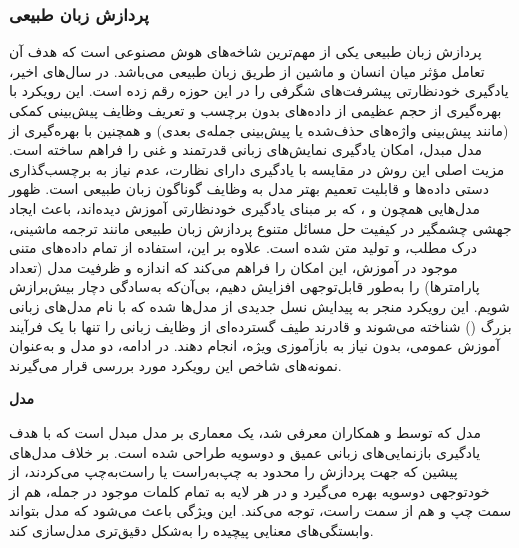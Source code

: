 \subsubsection{پردازش زبان طبیعی}
پردازش زبان طبیعی یکی از مهم‌ترین شاخه‌های هوش مصنوعی است که هدف آن تعامل مؤثر میان انسان و ماشین از طریق زبان طبیعی می‌باشد. در سال‌های اخیر، یادگیری خودنظارتی پیشرفت‌های شگرفی را در این حوزه رقم زده است. این رویکرد با بهره‌گیری از حجم عظیمی از داده‌های بدون برچسب و تعریف وظایف پیش‌بینی کمکی (مانند پیش‌بینی واژه‌های حذف‌شده یا پیش‌بینی جمله‌ی بعدی) و همچنین با بهره‌گیری از مدل مبدل\cite{vaswani2017attention}، امکان یادگیری نمایش‌های زبانی قدرتمند و غنی را فراهم ساخته است. مزیت اصلی این روش در مقایسه با یادگیری دارای نظارت، عدم نیاز به برچسب‌گذاری دستی داده‌ها و قابلیت تعمیم بهتر مدل به وظایف گوناگون زبان طبیعی است. ظهور مدل‌هایی همچون  و ، که بر مبنای یادگیری خودنظارتی آموزش دیده‌اند، باعث ایجاد جهشی چشمگیر در کیفیت حل مسائل متنوع پردازش زبان طبیعی مانند ترجمه ماشینی، درک مطلب، و تولید متن شده است. علاوه بر این، استفاده از تمام داده‌های متنی موجود در آموزش، این امکان را فراهم می‌کند که اندازه و ظرفیت مدل (تعداد پارامترها) را به‌طور قابل‌توجهی افزایش دهیم، بی‌آن‌که به‌سادگی دچار بیش‌برازش شویم. این رویکرد منجر به پیدایش نسل جدیدی از مدل‌ها شده که با نام مدل‌های زبانی بزرگ () شناخته می‌شوند و قادرند طیف گسترده‌ای از وظایف زبانی را تنها با یک فرآیند آموزش عمومی، بدون نیاز به بازآموزی ویژه، انجام دهند. در ادامه، دو مدل  و  به‌عنوان نمونه‌های شاخص این رویکرد مورد بررسی قرار می‌گیرند.\newline

\noindent\textbf{مدل }

مدل  که توسط  و همکاران\cite{devlin2019bert} معرفی شد،
یک معماری بر مدل مبدل است که با هدف یادگیری بازنمایی‌های زبانی عمیق و دوسویه طراحی شده است. بر خلاف مدل‌های پیشین که جهت پردازش را محدود به چپ‌به‌راست یا راست‌به‌چپ می‌کردند،
از خودتوجهی دوسویه
بهره می‌گیرد و در هر لایه به تمام کلمات موجود در جمله، هم از سمت چپ و هم از سمت راست، توجه می‌کند. این ویژگی باعث می‌شود که مدل بتواند وابستگی‌های معنایی پیچیده را به‌شکل دقیق‌تری مدل‌سازی کند.

